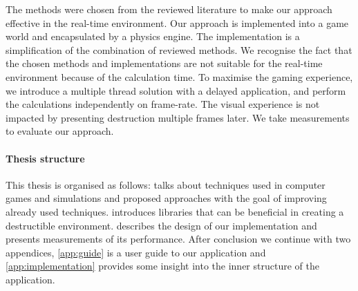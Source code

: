 The methods were chosen from the reviewed literature to make our approach effective in the real-time environment. Our approach is implemented into a game world and encapsulated by a physics engine. The implementation is a simplification of the combination of reviewed methods. We recognise the fact that the chosen methods and implementations are not suitable for the real-time environment because of the calculation time. To maximise the gaming experience, we introduce a multiple thread solution with a delayed application, and perform the calculations independently on frame-rate. The visual experience is not impacted by presenting destruction multiple frames later. We take measurements to evaluate our approach.

\paragraph{Thesis structure}
This thesis is organised as follows:  talks about techniques used in computer games and simulations and proposed approaches with the goal of improving already used techniques.  introduces libraries that can be beneficial in creating a destructible environment.  describes the design of our implementation and presents measurements of its performance. After conclusion we continue with two appendices, \cref{app:guide} is a user guide to our application and \cref{app:implementation} provides some insight into the inner structure of the application. 

